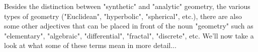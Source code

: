 \medskip
Besides the distinction between "synthetic" and "analytic" geometry, the various types of geometry ("Euclidean", "hyperbolic", "spherical", etc.), there are also some other adjectives that can be placed in front of the noun "geometry" such as "elementary", "algebraic", "differential", "fractal", "discrete", etc. We'll now take a look at what some of these terms mean in more detail...

\begin{comment}

https://en.wikipedia.org/wiki/Synthetic_geometry
https://en.wikipedia.org/wiki/Straightedge_and_compass_construction

https://en.wikipedia.org/wiki/Rigid_transformation

https://en.wikipedia.org/wiki/Similarity_(geometry)
https://en.wikipedia.org/wiki/Congruence_(geometry)
https://en.wikipedia.org/wiki/Erlangen_program

https://en.wikipedia.org/wiki/Playfair%

What defines "a" geometry? A set of axioms? Or a set/group of transformations? Or a metric? What is a model of a geometry?
I think, "a geometry" is indeed define by a set of axioms and a model for such a geometry is defined by a set of transformations and a metric? To state the axioms, we need a couple of basic concepts, such as "points", "lines", "angles", etc.

-axiomatic approach by Euclid, later by Hilbert
-classification of geometries (Felix Klein's Erlangen program)

https://en.wikipedia.org/wiki/Geometrization_conjecture#The_eight_Thurston_geometries

https://en.wikipedia.org/wiki/Erlangen_program

https://en.wikipedia.org/wiki/Poincar%

https://en.wikipedia.org/wiki/Hyperbolic_geometry#Models_of_the_hyperbolic_plane

https://en.wikipedia.org/wiki/Euclidean_geometry
https://en.wikipedia.org/wiki/Spherical_geometry
https://en.wikipedia.org/wiki/Elliptic_geometry
https://en.wikipedia.org/wiki/Hyperbolic_geometry

https://en.wikipedia.org/wiki/Hilbert%
https://en.wikipedia.org/wiki/Foundations_of_geometry

-synthetic vs. analytic geometry

https://www.youtube.com/watch?v=EmLzMYr6uHU



\end{comment}
